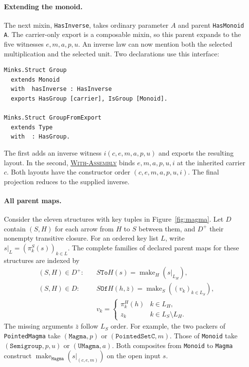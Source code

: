 \documentclass{article}
\newcommand{\ttt}[1]{\texttt{#1}}
\newcommand{\make}{\operatorname{make}}
\newcommand{\ruse}[1]{\hyperlink{rule-#1}{\textsc{#1}}}
\begin{document}
\paragraph{Extending the monoid.}
The next mixin, \ttt{HasInverse}, takes ordinary
parameter $A$ and parent \ttt{HasMonoid A}. The carrier-only export is
a composable mixin, so this parent expands to the five witnesses
$e,m,a,p,u$. An inverse law can now mention both the selected
multiplication and the selected unit. Two declarations use this interface:
\begin{verbatim}
Minks.Struct Group
  extends Monoid
  with  hasInverse : HasInverse
  exports HasGroup [carrier], IsGroup [Monoid].

Minks.Struct GroupFromExport
  extends Type
  with  : HasGroup.
\end{verbatim}
The first adds an inverse witness $i(c,e,m,a,p,u)$ and exports the resulting
layout. In the second, \ruse{With-Assembly} binds $e,m,a,p,u,i$ at the
inherited carrier $c$. Both layouts have the constructor order
$(c,e,m,a,p,u,i)$. The final projection reduces to the supplied inverse.

\paragraph{All parent maps.}
Consider the eleven structures with key tuples in Figure~\ref{fig:magma}.
Let $D$ contain $(S,H)$ for each arrow from $H$ to $S$ between them,
and $D^+$ their nonempty transitive closure. For an ordered key list
$L$, write $s|_L=(\pi^S_k(s))_{k\in L}$. The complete families of
declared parent maps for these structures are indexed by
\[
\begin{aligned}
 (S,H)\in D^+:\quad &S\ttt{To}H(s)=\make_H(s|_{L_H}),\\
 (S,H)\in D:\quad &S\ttt{Of}H(h,\bar z)=\make_S((v_k)_{k\in L_S}),\\
 &v_k=\begin{cases}\pi^H_k(h)&k\in L_H,\\z_k&k\in L_S\setminus L_H.\end{cases}
\end{aligned}
\]
The missing arguments $\bar z$ follow $L_S$ order. For example, the two
packers of \ttt{PointedMagma} take $(\ttt{Magma},p)$ or
$(\ttt{PointedSetC},m)$. Those of \ttt{Monoid} take
$(\ttt{Semigroup},p,u)$ or $(\ttt{UMagma},a)$.
Both composites from \ttt{Monoid} to \ttt{Magma} construct
$\make_{\ttt{Magma}}(s|_{(c,e,m)})$ on the open input $s$.
\end{document}
